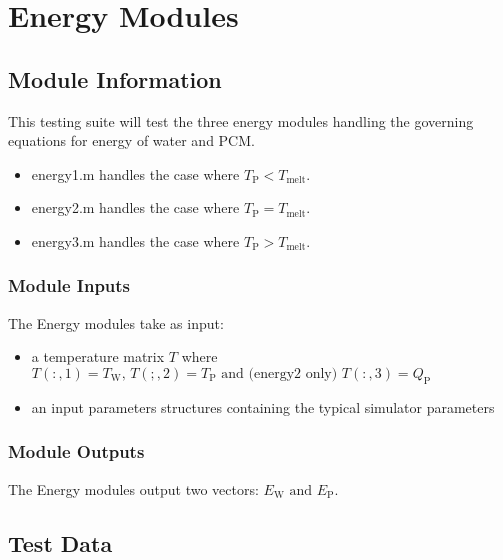\documentclass[12pt]{article}
\begin{document}
\section{Energy Modules}

\subsection{Module Information}
This testing suite will test the three energy modules handling the governing 
equations for energy of water and PCM.
\begin{itemize}
\item energy1.m handles the case where $T_{\text{P}} < T_{\text{melt}}$.
\item energy2.m handles the case where $T_{\text{P}} = T_{\text{melt}}$.
\item energy3.m handles the case where $T_{\text{P}} > T_{\text{melt}}$.
\end{itemize}

\subsubsection{Module Inputs}
The Energy modules take as input:
\begin{itemize}
\item a temperature matrix $T$ where $T(:,1) = T_{\text{W}} \text{, }
T(;,2) = T_{\text{P}} \text{ and (energy2 only) } T(:,3) = Q_{\text{P}}$
\item an input parameters structures containing the typical simulator parameters
\end{itemize}

\subsubsection{Module Outputs}
The Energy modules output two vectors: $E_{\text{W}} \text{ and } E_{\text{P}}$.

\subsection{Test Data}
\end{document}
